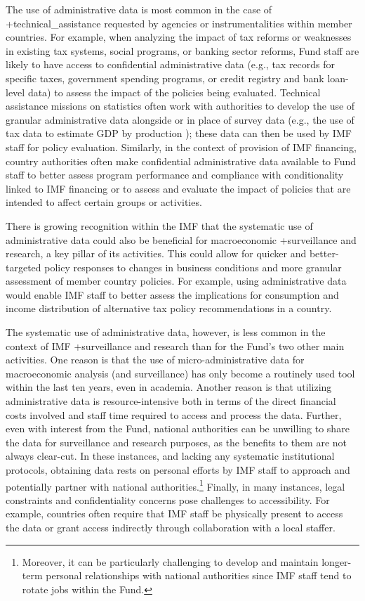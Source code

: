 \documentclass[
]{book}
\begin{document}
The use of administrative data is most common in the case of +technical\_assistance\textbar{} requested by agencies or instrumentalities within member countries. For example, when analyzing the impact of tax reforms or weaknesses in existing tax systems, social programs, or banking sector reforms, Fund staff are likely to have access to confidential administrative data (e.g., tax records for specific taxes, government spending programs, or credit registry and bank loan-level data) to assess the impact of the policies being evaluated. Technical assistance missions on statistics often work with authorities to develop the use of granular administrative data alongside or in place of survey data (e.g., the use of tax data to estimate GDP by production \citep{rivas2018}); these data can then be used by IMF staff for policy evaluation. Similarly, in the context of provision of IMF financing, country authorities often make confidential administrative data available to Fund staff to better assess program performance and compliance with conditionality linked to IMF financing or to assess and evaluate the impact of policies that are intended to affect certain groups or activities.

There is growing recognition within the IMF that the systematic use of administrative data could also be beneficial for macroeconomic +surveillance\textbar{} and research, a key pillar of its activities. This could allow for quicker and better-targeted policy responses to changes in business conditions and more granular assessment of member country policies. For example, using administrative data would enable IMF staff to better assess the implications for consumption and income distribution of alternative tax policy recommendations in a country.

The systematic use of administrative data, however, is less common in the context of IMF +surveillance\textbar{} and research than for the Fund's two other main activities. One reason is that the use of micro-administrative data for macroeconomic analysis (and surveillance) has only become a routinely used tool within the last ten years, even in academia. Another reason is that utilizing administrative data is resource-intensive both in terms of the direct financial costs involved and staff time required to access and process the data. Further, even with interest from the Fund, national authorities can be unwilling to share the data for surveillance and research purposes, as the benefits to them are not always clear-cut. In these instances, and lacking any systematic institutional protocols, obtaining data rests on personal efforts by IMF staff to approach and potentially partner with national authorities.\footnote{Moreover, it can be particularly challenging to develop and maintain longer-term personal relationships with national authorities since IMF staff tend to rotate jobs within the Fund.} Finally, in many instances, legal constraints and confidentiality concerns pose challenges to accessibility. For example, countries often require that IMF staff be physically present to access the data or grant access indirectly through collaboration with a local staffer.
\end{document}
